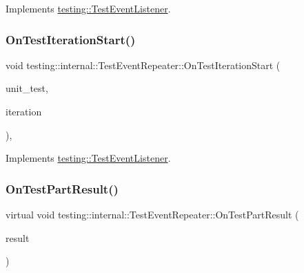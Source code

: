 Implements \mbox{\hyperlink{classtesting_1_1_test_event_listener_a60cc09b7907cb329d152eb5e7133bdeb}{testing\+::\+Test\+Event\+Listener}}.

\mbox{\label{classtesting_1_1internal_1_1_test_event_repeater_a98fea6c94833db424e083eff337ef370}} 
\subsubsection{\texorpdfstring{OnTestIterationStart()}{OnTestIterationStart()}\hspace{0.1cm}{\footnotesize\ttfamily [3/3]}}
{\footnotesize\ttfamily void testing\+::internal\+::\+Test\+Event\+Repeater\+::\+On\+Test\+Iteration\+Start (\begin{DoxyParamCaption}\item[{const \mbox{\hyperlink{classtesting_1_1_unit_test}{Unit\+Test}} \&}]{unit\+\_\+test,  }\item[{int}]{iteration }\end{DoxyParamCaption})\hspace{0.3cm}{\ttfamily [override]}, {\ttfamily [virtual]}}



Implements \mbox{\hyperlink{classtesting_1_1_test_event_listener_a60cc09b7907cb329d152eb5e7133bdeb}{testing\+::\+Test\+Event\+Listener}}.

\mbox{\label{classtesting_1_1internal_1_1_test_event_repeater_ac8fb21da6802b1ebab9cad3eee9150eb}} 
\subsubsection{\texorpdfstring{OnTestPartResult()}{OnTestPartResult()}\hspace{0.1cm}{\footnotesize\ttfamily [1/3]}}
{\footnotesize\ttfamily virtual void testing\+::internal\+::\+Test\+Event\+Repeater\+::\+On\+Test\+Part\+Result (\begin{DoxyParamCaption}\item[{const Test\+Part\+Result \&}]{result }\end{DoxyParamCaption})\hspace{0.3cm}{\ttfamily [virtual]}}



